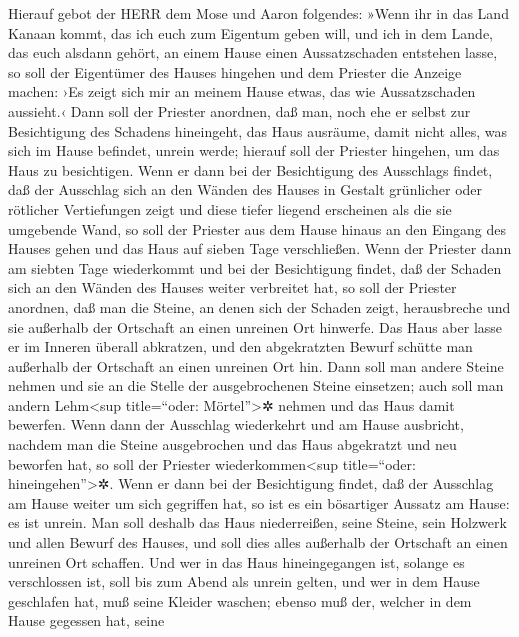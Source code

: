 Hierauf gebot der HERR dem Mose und Aaron folgendes:
»Wenn ihr in das Land Kanaan kommt, das ich euch zum
Eigentum geben will, und ich in dem Lande, das euch alsdann gehört, an
einem Hause einen Aussatzschaden entstehen lasse, so soll
der Eigentümer des Hauses hingehen und dem Priester die Anzeige machen:
›Es zeigt sich mir an meinem Hause etwas, das wie Aussatzschaden
aussieht.‹ Dann soll der Priester anordnen, daß man, noch
ehe er selbst zur Besichtigung des Schadens hineingeht, das Haus
ausräume, damit nicht alles, was sich im Hause befindet, unrein werde;
hierauf soll der Priester hingehen, um das Haus zu besichtigen.
Wenn er dann bei der Besichtigung des Ausschlags findet,
daß der Ausschlag sich an den Wänden des Hauses in Gestalt grünlicher
oder rötlicher Vertiefungen zeigt und diese tiefer liegend erscheinen
als die sie umgebende Wand, so soll der Priester aus dem
Hause hinaus an den Eingang des Hauses gehen und das Haus auf sieben
Tage verschließen. Wenn der Priester dann am siebten Tage
wiederkommt und bei der Besichtigung findet, daß der Schaden sich an den
Wänden des Hauses weiter verbreitet hat, so soll der
Priester anordnen, daß man die Steine, an denen sich der Schaden zeigt,
herausbreche und sie außerhalb der Ortschaft an einen unreinen Ort
hinwerfe. Das Haus aber lasse er im Inneren überall
abkratzen, und den abgekratzten Bewurf schütte man außerhalb der
Ortschaft an einen unreinen Ort hin. Dann soll man andere
Steine nehmen und sie an die Stelle der ausgebrochenen Steine einsetzen;
auch soll man andern Lehm\textless sup title=``oder:
Mörtel''\textgreater✲ nehmen und das Haus damit bewerfen.
Wenn dann der Ausschlag wiederkehrt und am Hause
ausbricht, nachdem man die Steine ausgebrochen und das Haus abgekratzt
und neu beworfen hat, so soll der Priester
wiederkommen\textless sup title=``oder: hineingehen''\textgreater✲. Wenn
er dann bei der Besichtigung findet, daß der Ausschlag am Hause weiter
um sich gegriffen hat, so ist es ein bösartiger Aussatz am Hause: es ist
unrein. Man soll deshalb das Haus niederreißen, seine
Steine, sein Holzwerk und allen Bewurf des Hauses, und soll dies alles
außerhalb der Ortschaft an einen unreinen Ort schaffen.
Und wer in das Haus hineingegangen ist, solange es
verschlossen ist, soll bis zum Abend als unrein gelten,
und wer in dem Hause geschlafen hat, muß seine Kleider
waschen; ebenso muß der, welcher in dem Hause gegessen hat, seine
